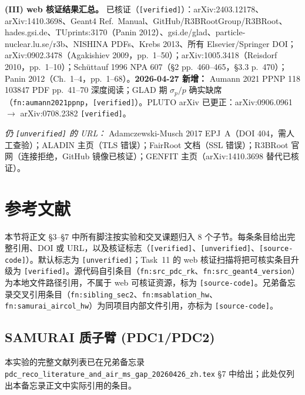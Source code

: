 \documentclass[a4paper, 11pt]{article}
\begin{document}
\textbf{(III) web 核证结果汇总。}
已核证（\texttt{[verified]}）：arXiv:2403.12178、arXiv:1410.3698、Geant4 Ref.\ Manual、GitHub/R3BRootGroup/R3BRoot、hades.gsi.de、TUprints:3170（Panin 2012）、gsi.de/glad、particle-nuclear.lu.se/r3b、NISHINA PDFs、Krebs 2013、所有 Elsevier/Springer DOI；arXiv:0902.3478（Agakishiev 2009，pp.~1--50）；arXiv:1005.3418（Reisdorf 2010，pp.~1--10）；Schüttauf 1996 NPA 607（§2 pp.~460--465，§3.3 p.~470）；Panin 2012（Ch.~1--4，pp.~1--68）。\textbf{2026-04-27 新增：} Aumann 2021 PPNP 118 103847 PDF pp.~41--70 深度阅读；GLAD 期 $\sigma_p/p$ 确实缺席（\texttt{fn:aumann2021ppnp}，\texttt{[verified]}）。PLUTO arXiv 已更正：arXiv:0906.0961 $\to$ arXiv:0708.2382 \texttt{[verified]}。

\textit{仍 \texttt{[unverified]} 的 URL：} Adamczewski-Musch 2017 EPJ~A（DOI 404，需人工查验）；ALADIN 主页（TLS 错误）；FairRoot 文档（SSL 错误）；R3BRoot 官网（连接拒绝，GitHub 镜像已核证）；GENFIT 主页（arXiv:1410.3698 替代已核证）。

\section{参考文献}

本节将正文 §3--§7 中所有脚注按实验和交叉课题归入 8 个子节。每条条目给出完整引用、DOI 或 URL，以及核证标志（\texttt{[verified]}、\texttt{[unverified]}、\texttt{[source-code]}）。默认标志为 \texttt{[unverified]}；Task~11 的 web 核证扫描将把可核实条目升级为 \texttt{[verified]}。源代码自引条目（\texttt{fn:src\_pdc\_rk}、\texttt{fn:src\_geant4\_version}）为本地文件路径引用，不属于 web 可核证资源，标为 \texttt{[source-code]}。兄弟备忘录交叉引用条目（\texttt{fn:sibling\_sec2}、\texttt{fn:msablation\_hw}、\texttt{fn:samurai\_aircol\_hw}）为同项目内部文件引用，亦标为 \texttt{[source-code]}。

\subsection{SAMURAI 质子臂 (PDC1/PDC2)}

本实验的完整文献列表已在兄弟备忘录 \texttt{pdc\_reco\_literature\_and\_air\_ms\_gap\_20260426\_zh.tex} §7 中给出；此处仅列出本备忘录正文中实际引用的条目。
\end{document}
